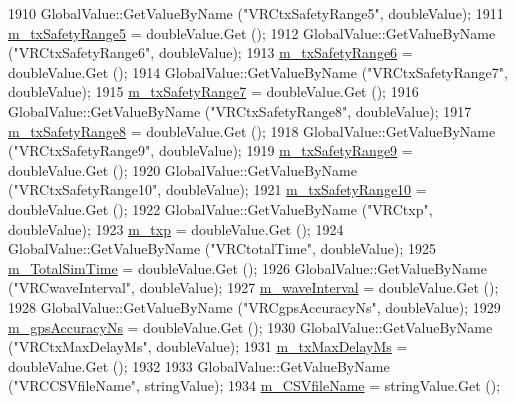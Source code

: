 \begin{DoxyCode}
1910   GlobalValue::GetValueByName (\textcolor{stringliteral}{"VRCtxSafetyRange5"}, doubleValue);
1911   \hyperlink{classVanetRoutingExperiment_a2b3e42d76f8d74100087b633e4b9295f}{m\_txSafetyRange5} = doubleValue.Get ();
1912   GlobalValue::GetValueByName (\textcolor{stringliteral}{"VRCtxSafetyRange6"}, doubleValue);
1913   \hyperlink{classVanetRoutingExperiment_a19582595367bfd9fde2febb9108b6fea}{m\_txSafetyRange6} = doubleValue.Get ();
1914   GlobalValue::GetValueByName (\textcolor{stringliteral}{"VRCtxSafetyRange7"}, doubleValue);
1915   \hyperlink{classVanetRoutingExperiment_a5d3143091b54bcabaf43bea41d464bdb}{m\_txSafetyRange7} = doubleValue.Get ();
1916   GlobalValue::GetValueByName (\textcolor{stringliteral}{"VRCtxSafetyRange8"}, doubleValue);
1917   \hyperlink{classVanetRoutingExperiment_a264dfa5219cb2bf6535743fc2906f8b1}{m\_txSafetyRange8} = doubleValue.Get ();
1918   GlobalValue::GetValueByName (\textcolor{stringliteral}{"VRCtxSafetyRange9"}, doubleValue);
1919   \hyperlink{classVanetRoutingExperiment_ad2675092fe212a15aa1f0b60fb2bea8d}{m\_txSafetyRange9} = doubleValue.Get ();
1920   GlobalValue::GetValueByName (\textcolor{stringliteral}{"VRCtxSafetyRange10"}, doubleValue);
1921   \hyperlink{classVanetRoutingExperiment_a70efcbeee57dd1b12364ff3ef00f7b02}{m\_txSafetyRange10} = doubleValue.Get ();
1922   GlobalValue::GetValueByName (\textcolor{stringliteral}{"VRCtxp"}, doubleValue);
1923   \hyperlink{classVanetRoutingExperiment_a8acdb7cf31487aa0d721263fde2a7f3e}{m\_txp} = doubleValue.Get ();
1924   GlobalValue::GetValueByName (\textcolor{stringliteral}{"VRCtotalTime"}, doubleValue);
1925   \hyperlink{classVanetRoutingExperiment_acae630bc30645931dcb68283b0217b1b}{m\_TotalSimTime} = doubleValue.Get ();
1926   GlobalValue::GetValueByName (\textcolor{stringliteral}{"VRCwaveInterval"}, doubleValue);
1927   \hyperlink{classVanetRoutingExperiment_a273a08aab5e5e9c40b9ce6d51577b640}{m\_waveInterval} = doubleValue.Get ();
1928   GlobalValue::GetValueByName (\textcolor{stringliteral}{"VRCgpsAccuracyNs"}, doubleValue);
1929   \hyperlink{classVanetRoutingExperiment_a93d058dcc4a02c67de923ab6a1d8bf85}{m\_gpsAccuracyNs} = doubleValue.Get ();
1930   GlobalValue::GetValueByName (\textcolor{stringliteral}{"VRCtxMaxDelayMs"}, doubleValue);
1931   \hyperlink{classVanetRoutingExperiment_a9190dcd0fea18c790a67ee058416c8dd}{m\_txMaxDelayMs} = doubleValue.Get ();
1932 
1933   GlobalValue::GetValueByName (\textcolor{stringliteral}{"VRCCSVfileName"}, stringValue);
1934   \hyperlink{classVanetRoutingExperiment_a0fab315c81d7da9e59216c3790f55da4}{m\_CSVfileName} = stringValue.Get ();

\end{DoxyCode}

